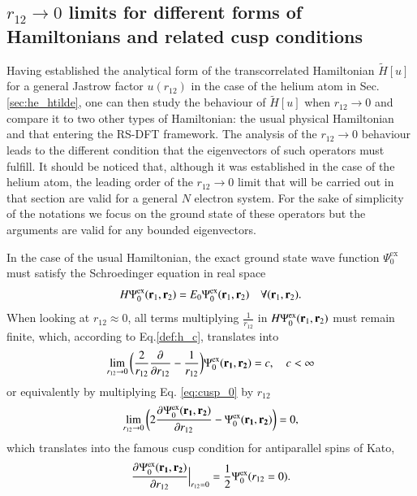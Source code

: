 \documentclass[aip,jcp,reprint,noshowkeys,superscriptaddress]{revtex4-1}
\newcommand{\deriv}[3]{\frac{\partial^{#3} #1}{\partial {#2}^{#3}}}
\newcommand{\bd}[1]{{\bf {#1}}}
\newcommand{\br}[0]{{\bf {r}}}
\newcommand{\psiex}[0]{\Psi^{\text{ex}}_0}
\begin{document}
\subsection{$r_{12} \rightarrow 0$ limits for different forms of Hamiltonians and related cusp conditions}
\label{sec:cusp}
Having established the analytical form of the transcorrelated Hamiltonian $\tilde{H}[u]$ for a general Jastrow factor $u(r_{12})$ in the case of the helium atom in Sec. \ref{sec:he_htilde}, one can then study the behaviour of $\tilde{H}[u]$ when $r_{12}\rightarrow 0$ and compare it to two other types of Hamiltonian: the usual physical Hamiltonian and that entering the RS-DFT framework. 
The analysis of the $r_{12}\rightarrow 0$ behaviour leads to the different condition that the eigenvectors of such operators must fulfill. 
It should be noticed that, although it was established in the case of the helium atom, the leading order of the $r_{12} \rightarrow 0$ limit that will be carried out in that section are valid for a general $N$ electron system. 
For the sake of simplicity of the notations we focus on the ground state of these operators but the arguments are valid for any bounded eigenvectors. 

In the case of the usual Hamiltonian, the exact ground state wave function $\psiex$ must satisfy the Schroedinger equation in real space 
\begin{equation}
 H \psiex(\br{}_1,\br{}_2) = E_0 \psiex(\br{}_1,\br{}_2)\quad \forall (\br{}_1,\br{}_2).
\end{equation}
When looking at $r_{12}\approx 0$, all terms multiplying $\frac{1}{r_{12}}$ in $H \psiex(\br{}_1,\br{}_2)$ must remain finite, which, according to Eq.\eqref{def:h_c}, translates into
\begin{equation}
 \label{eq:cusp_0}
 \lim_{r_{12}\rightarrow 0}\bigg( \frac{2}{r_{12}} \deriv{}{r_{12}}{} -\frac{1}{r_{12}}\bigg) \psiex(\bd{r_1},\bd{r_2})  = c,\quad c<\infty 
\end{equation}
or equivalently by multiplying Eq. \eqref{eq:cusp_0} by $r_{12}$
\begin{equation}
 \lim_{r_{12}\rightarrow 0}\bigg( 2 \deriv{\psiex(\bd{r_1},\bd{r_2})}{r_{12}}{} -\psiex(\bd{r_1},\bd{r_2}) \bigg) = 0, 
\end{equation}
which translates into the famous cusp condition for antiparallel spins of Kato\cite{Kat-CPAM-57}, 
\begin{equation}
 \deriv{\psiex(\bd{r_1},\bd{r_2})}{r_{12}}{}\Bigr|_{r_{12}=0} = \frac{1}{2} \psiex(r_{12}=0). 
\end{equation} 
\end{document}
